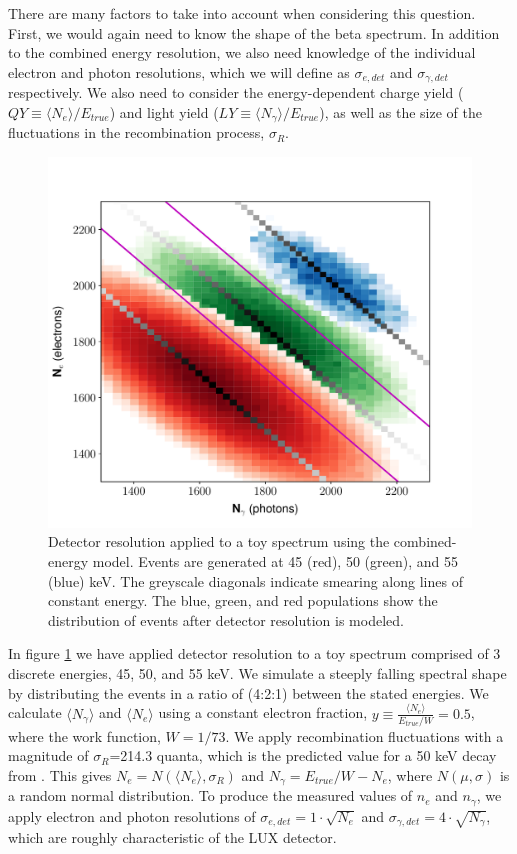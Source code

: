 There are many factors to take into account when considering this question. First, we would again need to know the shape of the beta spectrum. In addition to the combined energy resolution, we also need knowledge of the individual electron and photon resolutions, which we will define as $\sigma_{e,det}$ and $\sigma_{\gamma,det}$ respectively. We also need to consider the energy-dependent charge yield ($QY\equiv \langle N_{e} \rangle/E_{true}$) and light yield ($LY\equiv \langle N_{\gamma} \rangle/E_{true}$), as well as the size of the fluctuations in the recombination process, $\sigma_R$. 
\begin{figure}[h!]
\centering
\includegraphics[width=\textwidth]{Figures/toy_smearing_2d_Rflat.pdf}
\caption{Detector resolution applied to a toy spectrum using the combined-energy model. Events are generated at 45 (red), 50 (green), and 55 (blue) keV. The greyscale diagonals indicate smearing along lines of constant energy. The blue, green, and red populations show the distribution of events after detector resolution is modeled.}
\label{fig:toysmear2d}
\end{figure}

In figure \ref{fig:toysmear2d} we have applied detector resolution to a toy spectrum comprised of 3 discrete energies, 45, 50, and 55 keV. We simulate a steeply falling spectral shape by distributing the events in a ratio of (4:2:1) between the stated energies. We calculate $\langle N_{\gamma} \rangle$ and $\langle N_{e} \rangle$ using a constant electron fraction, $y\equiv \frac{\langle N_{e} \rangle}{E_{true}/W}=0.5$, where the work function, $W=1/73$. We apply recombination fluctuations with a magnitude of $\sigma_R$=214.3 quanta, which is the predicted value for a 50 keV decay from \cite{attila}. This gives $N_{e}=N(\langle N_{e} \rangle,\sigma_R)$ and $N_{\gamma}=E_{true}/W-N_{e}$, where $N(\mu,\sigma)$ is a random normal distribution. To produce the measured values of $n_e$ and $n_{\gamma}$, we apply electron and photon resolutions of $\sigma_{e,det}=1\cdot \sqrt{N_{e}}$ and $\sigma_{\gamma,det}=4\cdot \sqrt{N_{\gamma}}$, which are roughly characteristic of the LUX detector. 

